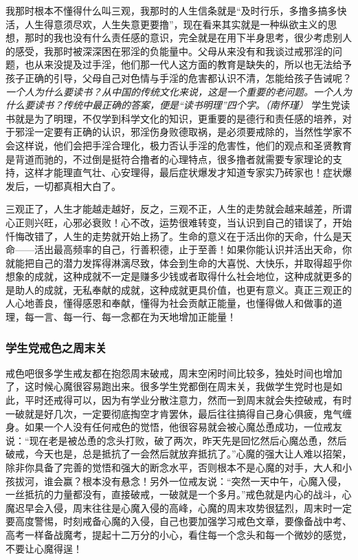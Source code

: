 我那时根本不懂得什么叫三观，我那时的人生信条就是“及时行乐，多撸多搞多快活，人生得意须尽欢，人生失意更要撸”，现在看来其实就是一种纵欲主义的思想，那时的我也没有什么责任感的意识，完全就是在用下半身思考，很少考虑别人的感受，我那时被深深困在邪淫的负能量中。父母从来没有和我谈过戒邪淫的问题，也从来没提及过手淫，他们那一代人这方面的教育是缺失的，所以也无法给予孩子正确的引导，父母自己对色情与手淫的危害都认识不清，怎能给孩子告诫呢？\textit{一个人为什么要读书？从中国的传统文化来说，这是一个重要的老问题。一个人为什么要读书？传统中最正确的答案，便是“读书明理”四个字。（南怀瑾）} 学生党读书就是为了明理，不仅学到科学文化的知识，更重要的是德行和责任感的培养，对于邪淫一定要有正确的认识，邪淫伤身败德取祸，是必须要戒除的，当然性学家不会这样说，他们会把手淫合理化，极力否认手淫的危害性，他们的观点和圣贤教育是背道而驰的，不过倒是挺符合撸者的心理特点，很多撸者就需要专家理论的支持，这样才能理直气壮、心安理得，最后症状爆发才知道专家实乃砖家也！症状爆发后，一切都真相大白了。

三观正了，人生才能越走越好，反之，三观不正，人生的走势就会越来越差，所谓心正则兴旺，心邪必衰败！心不改，运势很难转变，当认识到自己的错误了，开始忏悔改错了，人生的走势就开始上扬了。生命的意义在于活出你的天命，什么是天命——活出最高频率的自己，行善积德，止于至善！如果你能认识并活出天命，你就能把自己的潜力发挥得淋漓尽致，体会到生命的大喜悦、大快乐，并取得超乎你想象的成就，这种成就不一定是赚多少钱或者取得什么社会地位，这种成就更多的是助人的成就，无私奉献的成就，这种成就更具价值，也更有意义。真正三观正的人心地善良，懂得感恩和奉献，懂得为社会贡献正能量，也懂得做人和做事的道理，每一言、每一行、每一念都在为天地增加正能量！

\subsubsection{学生党戒色之周末关}

戒色吧很多学生戒友都在抱怨周末破戒，周末空闲时间比较多，独处时间也增加了，这时候心魔很容易跑出来。很多学生党都倒在周末关，我做学生党时也是如此，平时还戒得可以，因为有学业分散注意力，然而一到周末就会失控破戒，有时一破就是好几次，一定要彻底掏空才肯罢休，最后往往搞得自己身心俱疲，鬼气缠身。如果一个人没有任何戒色的觉悟，他很容易就会被心魔怂恿成功，一位戒友说：“现在老是被怂恿的念头打败，破了两次，昨天先是回忆然后心魔怂恿，然后破戒，今天也是，总是抵抗了一会然后就放弃抵抗了。”心魔的强大让人难以招架，除非你具备了完善的觉悟和强大的断念水平，否则根本不是心魔的对手，大人和小孩拔河，谁会赢？根本没有悬念！另外一位戒友说：“突然一天中午，心魔入侵，一丝抵抗的力量都没有，直接破戒，一破就是一个多月。”戒色就是内心的战斗，心魔迟早会入侵，周末往往是心魔入侵的高峰，心魔的周末攻势很猛烈，周末时一定要高度警惕，时刻戒备心魔的入侵，自己也要加强学习戒色文章，要像备战中考、高考一样备战魔考，提起十二万分的小心，看住每一个念头和每一个微妙的感觉，不要让心魔得逞！

